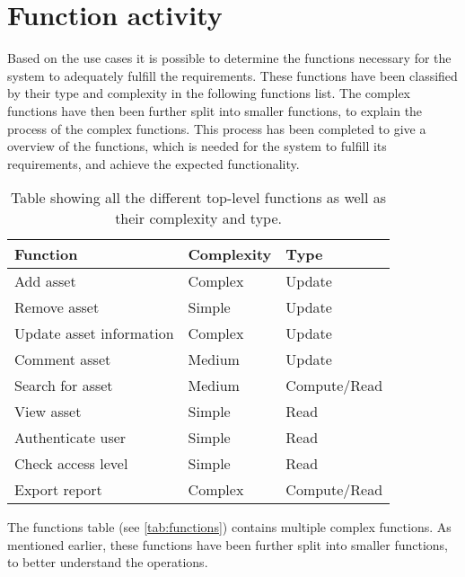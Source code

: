 \section{Function activity}\label{sc:function}
Based on the use cases it is possible to determine the functions necessary for the system to adequately fulfill the requirements. These functions have been classified by their type and complexity in the following functions list. The complex functions have then been further split into smaller functions, to explain the process of the complex functions. This process has been completed to give a overview of the functions, which is needed for the system to fulfill its requirements, and achieve the expected functionality.
\par

\vspace{0.5cm}

\begin{table}[H]
\centering
    \begin{tabular}{|l|l|l|}
        \hline
        \textbf{Function} & \textbf{Complexity} & \textbf{Type} \\
        \hline
        \hline
        Add asset & Complex & Update\\
        \hline
        Remove asset & Simple & Update\\
        \hline
        Update asset information & Complex & Update\\
        \hline
        Comment asset & Medium & Update\\
        \hline
        Search for asset & Medium & Compute/Read\\
        \hline
        View asset & Simple & Read\\
        \hline
        Authenticate user & Simple & Read\\
        \hline
        Check access level & Simple & Read\\
        \hline
        Export report & Complex & Compute/Read\\
        \hline
    \end{tabular}
\caption{Table showing all the different top-level functions as well as their complexity and type.}\label{tab:functions}
\end{table}

\vspace{0.5cm}

The functions table (see \autoref{tab:functions}) contains multiple complex functions. As mentioned earlier, these functions have been further split into smaller functions, to better understand the operations. 


